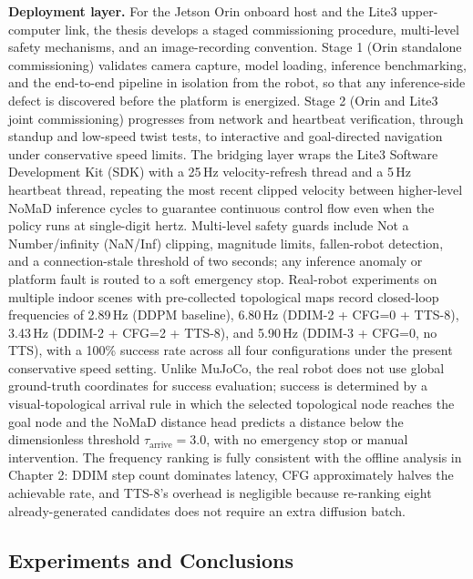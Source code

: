 \begin{digest}[en]
\textbf{Deployment layer.} For the Jetson Orin onboard host and the Lite3
upper-computer link, the thesis develops a staged commissioning procedure, multi-level
safety mechanisms, and an image-recording convention. Stage 1 (Orin standalone
commissioning) validates camera capture, model loading, inference benchmarking, and
the end-to-end pipeline in isolation from the robot, so that any inference-side defect
is discovered before the platform is energized. Stage 2 (Orin and Lite3 joint
commissioning) progresses from network and heartbeat verification, through standup and
low-speed twist tests, to interactive and goal-directed navigation under conservative
speed limits. The bridging layer wraps the Lite3 Software Development Kit (SDK) with a 25\,Hz velocity-refresh
thread and a 5\,Hz heartbeat thread, repeating the most recent clipped velocity
between higher-level NoMaD inference cycles to guarantee continuous control flow even
when the policy runs at single-digit hertz. Multi-level safety guards include
Not a Number/infinity (NaN/Inf) clipping, magnitude limits, fallen-robot detection, and a connection-stale
threshold of two seconds; any inference anomaly or platform fault is routed to a soft
emergency stop. Real-robot experiments on multiple indoor scenes with pre-collected
topological maps record closed-loop frequencies of 2.89\,Hz (DDPM baseline), 6.80\,Hz
(DDIM-2 + CFG=0 + TTS-8), 3.43\,Hz (DDIM-2 + CFG=2 + TTS-8), and 5.90\,Hz
(DDIM-3 + CFG=0, no TTS), with a 100\% success rate across all four configurations
under the present conservative speed setting. Unlike MuJoCo, the real robot does not
use global ground-truth coordinates for success evaluation; success is determined by
a visual-topological arrival rule in which the selected topological node reaches the
goal node and the NoMaD distance head predicts a distance below the dimensionless
threshold $\tau_{\mathrm{arrive}}=3.0$, with no emergency stop or manual intervention.
The frequency ranking is fully
consistent with the offline analysis in Chapter 2: DDIM step count dominates latency,
CFG approximately halves the achievable rate, and TTS-8's overhead is negligible
because re-ranking eight already-generated candidates does not require an extra
diffusion batch.

\subsection*{Experiments and Conclusions}


\end{digest}
